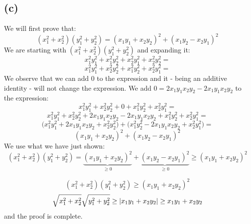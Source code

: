 \documentclass{article}
\begin{document}
\subsection*{(c)}
We will first prove that:
\begin{equation*}
	(x_{1}^{2} + x_{2}^{2})(y_{1}^{2} + y_{2}^{2}) = (x_{1}y_{1} + x_{2}y_{2})^{2} + (x_{1}y_{2} - x_{2}y_{1})^{2}
\end{equation*}
We are starting with \((x_{1}^{2} + x_{2}^{2})(y_{1}^{2} + y_{2}^{2})\) and expanding it:
\begin{equation*}
	x_{1}^{2}y_{1}^{2} + x_{1}^{2}y_{2}^{2} + x_{2}^{2}y_{1}^{2} + x_{2}^{2}y_{2}^{2} =
\end{equation*}
\begin{equation*}
	x_{1}^{2}y_{1}^{2} + x_{2}^{2}y_{2}^{2} + x_{1}^{2}y_{2}^{2} + x_{2}^{2}y_{1}^{2} =
\end{equation*}
We observe that we can add \(0\) to the expression and it - being an additive identity - will not
change the expression. We add \(0 = 2x_{1}y_{1}x_{2}y_{2} - 2x_{1}y_{1}x_{2}y_{2}\) to the expression:
\begin{equation*}
	x_{1}^{2}y_{1}^{2} + x_{2}^{2}y_{2}^{2} + 0 + x_{1}^{2}y_{2}^{2} + x_{2}^{2}y_{1}^{2} =
\end{equation*}
\begin{equation*}
	x_{1}^{2}y_{1}^{2} + x_{2}^{2}y_{2}^{2} + 2x_{1}y_{1}x_{2}y_{2} - 2x_{1}y_{1}x_{2}y_{2} + x_{1}^{2}y_{2}^{2} + x_{2}^{2}y_{1}^{2} =
\end{equation*}
\begin{equation*}
	\Big( x_{1}^{2}y_{1}^{2} + 2x_{1}y_{1}x_{2}y_{2} + x_{2}^{2}y_{2}^{2} \Big) + \Big( x_{1}^{2}y_{2}^{2} - 2x_{1}y_{1}x_{2}y_{2} + x_{2}^{2}y_{1}^{2} \Big) =
\end{equation*}
\begin{equation*}
	(x_{1}y_{1} + x_{2}y_{2})^{2} + (x_{1}y_{2} - x_{2}y_{1})^{2}
\end{equation*}
We use what we have just shown:
\begin{equation*}
	(x_{1}^{2} + x_{2}^{2})(y_{1}^{2} + y_{2}^{2}) = \underbrace{(x_{1}y_{1} + x_{2}y_{2})^{2}}_\text{\(\geq 0\)} + \underbrace{(x_{1}y_{2} - x_{2}y_{1})^{2}}_\text{\(\geq 0\)} \geq (x_{1}y_{1} + x_{2}y_{2})^{2}
\end{equation*}

\begin{equation*}
	(x_{1}^{2} + x_{2}^{2})(y_{1}^{2} + y_{2}^{2}) \geq (x_{1}y_{1} + x_{2}y_{2})^{2}
\end{equation*}
\begin{equation*}
	\sqrt{x_{1}^{2} + x_{2}^{2}}\sqrt{y_{1}^{2} + y_{2}^{2}} \geq \abs{x_{1}y_{1} + x_{2}y_{2}} \geq x_{1}y_{1} + x_{2}y_{2}
\end{equation*}
and the proof is complete.
\end{document}
